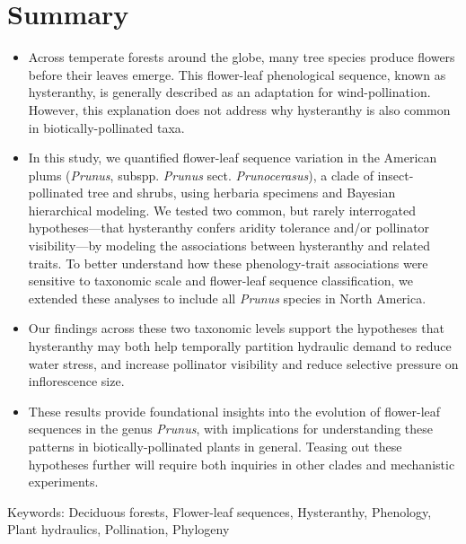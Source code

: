 \documentclass{article}[12pt]
\begin{document}
\section*{Summary} %
\begin{itemize}
\item Across temperate forests around the globe, many tree species produce flowers before their leaves emerge. This flower-leaf phenological sequence, known as hysteranthy, is generally described as an adaptation for wind-pollination. However, this explanation does not address why hysteranthy is also common in biotically-pollinated taxa.

\item In this study, we quantified flower-leaf sequence variation in the American plums (\emph{Prunus}, subspp. \emph{Prunus} sect. \emph{Prunocerasus}), a clade of insect-pollinated tree and shrubs, using herbaria specimens and Bayesian hierarchical modeling. We tested two common, but rarely interrogated hypotheses---that hysteranthy confers aridity tolerance and/or pollinator visibility---by modeling the associations between hysteranthy and related traits. To better understand how these phenology-trait associations were sensitive to taxonomic scale and flower-leaf sequence classification, we extended these analyses to include all \emph{Prunus} species in North America. 

\item Our findings across these two taxonomic levels support the hypotheses that hysteranthy may both help temporally partition hydraulic demand to reduce water stress, and increase pollinator visibility and reduce selective pressure on inflorescence size.


\item These results provide foundational insights into the evolution of flower-leaf sequences in the genus \emph{Prunus}, with implications for understanding these patterns in biotically-pollinated plants in general. Teasing out these hypotheses further will require both inquiries in other clades and mechanistic experiments.
\end{itemize}

Keywords: Deciduous forests, Flower-leaf sequences, Hysteranthy, Phenology, Plant hydraulics, Pollination, Phylogeny

\pagebreak
\end{document}
